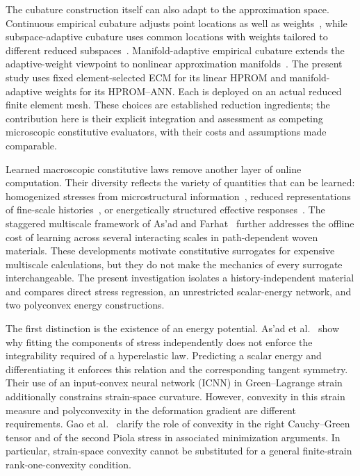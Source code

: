 The cubature construction itself can also adapt to the approximation space. Continuous empirical cubature adjusts point locations as well as weights~\cite{Hernandez2024}, while subspace-adaptive cubature uses common locations with weights tailored to different reduced subspaces~\cite{Bravo2024}. Manifold-adaptive empirical cubature extends the adaptive-weight viewpoint to nonlinear approximation manifolds~\cite{hernandez2026}. The present study uses fixed element-selected ECM for its linear HPROM and manifold-adaptive weights for its HPROM--ANN. Each is deployed on an actual reduced finite element mesh. These choices are established reduction ingredients; the contribution here is their explicit integration and assessment as competing microscopic constitutive evaluators, with their costs and assumptions made comparable.

Learned macroscopic constitutive laws remove another layer of online computation. Their diversity reflects the variety of quantities that can be learned: homogenized stresses from microstructural information~\cite{Aldakheel2023}, reduced representations of fine-scale histories~\cite{Liu2022}, or energetically structured effective responses~\cite{asad2022,kalina2023}. The staggered multiscale framework of As'ad and Farhat~\cite{AsadFarhat2026} further addresses the offline cost of learning across several interacting scales in path-dependent woven materials. These developments motivate constitutive surrogates for expensive multiscale calculations, but they do not make the mechanics of every surrogate interchangeable. The present investigation isolates a history-independent material and compares direct stress regression, an unrestricted scalar-energy network, and two polyconvex energy constructions.

The first distinction is the existence of an energy potential. As'ad et al.~\cite{asad2022} show why fitting the components of stress independently does not enforce the integrability required of a hyperelastic law. Predicting a scalar energy and differentiating it enforces this relation and the corresponding tangent symmetry. Their use of an input-convex neural network (ICNN) in Green--Lagrange strain additionally constrains strain-space curvature. However, convexity in this strain measure and polyconvexity in the deformation gradient are different requirements. Gao et al.~\cite{GaoNeffRoventaThiel2017} clarify the role of convexity in the right Cauchy--Green tensor and of the second Piola stress in associated minimization arguments. In particular, strain-space convexity cannot be substituted for a general finite-strain rank-one-convexity condition.

